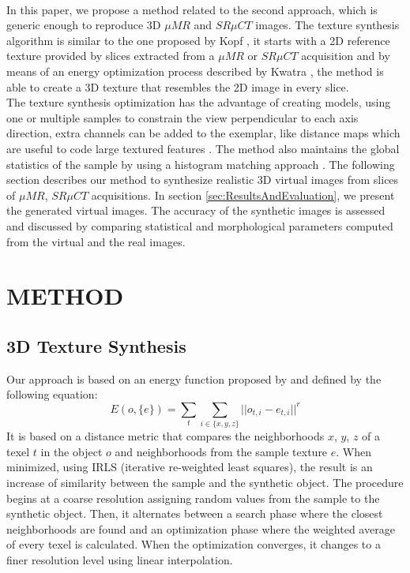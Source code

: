 \documentclass[10pt, conference]{IEEEtran}
\begin{document}
{\\
In this paper, we propose a method related to the second approach, which is generic enough to reproduce 3D $\mu{MR}$ and $SR \mu{CT}$ images. 
The texture synthesis algorithm is similar to the one proposed by Kopf \cite{KFCODLW07}, it starts with a 2D reference texture
provided by slices extracted from a $\mu{MR}$ or $SR \mu{CT}$ acquisition and by means of an energy optimization process 
described by Kwatra \cite{kwatra:2005:SIGGRAPH}, the method is able to create a 3D texture that resembles the 2D image in every slice.
\\
The texture synthesis optimization has the advantage of creating models, using one or multiple samples 
to constrain the view perpendicular to each axis direction, extra channels can be added to the exemplar, like distance maps 
which are useful to code large textured features \cite{Lefebvre:2006:ATS:1141911.1141921}.
The method also maintains the global statistics of the sample by using a histogram matching approach \cite{ROLLAND2000}.
The following section describes our method to synthesize realistic 3D virtual images from slices of $\mu{MR}$, $SR \mu{CT}$ acquisitions.
In section \ref{sec:ResultsAndEvaluation}, we present the generated virtual images. 
The accuracy of the synthetic images is assessed and discussed by comparing statistical and morphological parameters computed from the virtual and the real images. 
%
%
\section{\uppercase{Method}}
\label{sec:Methods}
\subsection{3D Texture Synthesis}
\label{sec:TextureSynthesis}
%
Our approach is based on an energy function 
proposed by \cite{kwatra:2005:SIGGRAPH} and defined by the following equation:
%
\begin{equation}
 E(o, \{e\} ) = \sum_{t} \sum_{i \in \{x, y, z\}} || o_{t, i} - e_{t, i} ||^r
 \label{equ:imagenergy} 
\end{equation}
%
It is based on a distance metric that compares the neighborhoods $x$, $y$, $z$ 
of a texel $t$ in the object $o$ and neighborhoods from the sample texture $e$. 
When minimized, using IRLS (iterative re-weighted least squares), 
the result is an increase of similarity between the sample and the synthetic object.
%
The procedure begins at a coarse resolution assigning random values from the sample to the synthetic object. 
Then, it alternates between a search phase where the closest neighborhoods are found 
and an optimization phase where the weighted average of every texel is calculated. 
When the optimization converges, it changes to a finer resolution level using linear interpolation.

}
\end{document}
